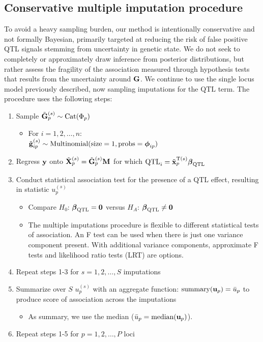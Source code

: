 \subsection{Conservative multiple imputation procedure}

To avoid a heavy sampling burden, our method is intentionally conservative and not formally Bayesian, primarily targeted at reducing the risk of false positive QTL signals stemming from uncertainty in genetic state. We do not seek to completely or approximately draw inference from posterior distributions, but rather assess the fragility of the association measured through hypothesis tests that results from the uncertainty around $\mathbf{G}$. We continue to use the single locus model previously described, now sampling imputations for the $\text{QTL}$ term. The procedure uses the following steps:
\begin{enumerate}
	\item Sample $\tilde{\mathbf{G}}^{(s)}_{p} \sim \text{Cat}(\Phi_{p})$
	\begin{itemize}
		\item For $i = 1, 2, \ldots, n$: \\ $\tilde{\mathbf{g}}_{ip}^{(s)} \sim \text{Multinomial}(\text{size}=1, \text{probs} = \boldsymbol{\phi}_{ip})$ 
	\end{itemize}
	\item Regress $\mathbf{y}$ onto $\tilde{\mathbf{X}}_{p}^{(s)} = \tilde{\mathbf{G}}^{(s)}_{p}\mathbf{M}$ for which $\text{QTL}_{i} = \tilde{\mathbf{x}}^{\text{T}(s)}_{p} \boldsymbol{\beta}_{\text{QTL}}$
	\item Conduct statistical association test for the presence of a QTL effect, resulting in statistic $u^{(s)}_{p}$
	\begin{itemize}
		\item Compare $H_{0}$: $\boldsymbol{\beta}_{\text{QTL}} = \mathbf{0}$ versus $H_{A}$: $\boldsymbol{\beta}_{\text{QTL}} \neq \mathbf{0}$
		\item The multiple imputations procedure is flexible to different statistical tests of association. An F test can be used when there is just one variance component present. With additional variance components, approximate F tests \citep{Halekoh2014} and likelihood ratio tests (LRT) are options.
	\end{itemize}
	\item Repeat steps 1-3 for $s = 1, 2, \ldots, S$ imputations
	\item Summarize over $S$ $u^{(s)}_{p}$ with an aggregate function: $\text{summary}(\mathbf{u}_{p}) = \bar{u}_{p}$ to produce score of association across the imputations
	\begin{itemize}
		\item As summary, we use the median ($\bar{u}_{p} = \text{median}(\mathbf{u}_{p})$).
	\end{itemize}
	\item Repeat steps 1-5 for $p = 1, 2, \ldots, P$ loci
\end{enumerate}

